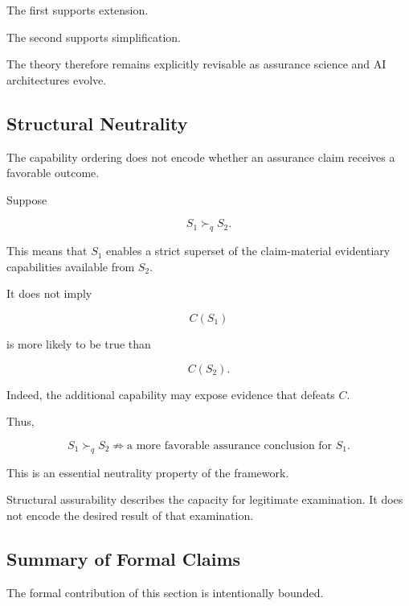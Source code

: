 The first supports extension.

The second supports simplification.

The theory therefore remains explicitly revisable as assurance science and AI architectures evolve.

\subsection{Structural Neutrality}
\label{aa.subsec.formal-neutrality}

The capability ordering does not encode whether an assurance claim receives a favorable outcome.

Suppose

\begin{equation}
  S_1
  \succ_q
  S_2.
\end{equation}

This means that \(S_1\) enables a strict superset of the claim-material evidentiary capabilities available from \(S_2\).

It does not imply

\begin{equation}
  C(S_1)
\end{equation}

is more likely to be true than

\begin{equation}
  C(S_2).
\end{equation}

Indeed, the additional capability may expose evidence that defeats \(C\).

Thus,

\begin{equation}
  \boxed{
    S_1\succ_q S_2
    \not\Rightarrow
    \text{a more favorable assurance conclusion for }S_1.
  }
\end{equation}

This is an essential neutrality property of the framework.

Structural assurability describes the capacity for legitimate examination.
It does not encode the desired result of that examination.

\subsection{Summary of Formal Claims}
\label{aa.subsec.formal-summary}

The formal contribution of this section is intentionally bounded.

